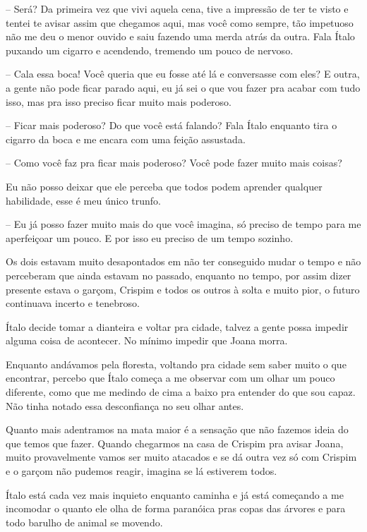 -- Será? Da primeira vez que vivi aquela cena, tive a impressão de ter te visto e tentei te avisar assim que chegamos aqui, mas você como sempre, tão impetuoso não me deu o menor ouvido e saiu fazendo uma merda atrás da outra. Fala Ítalo puxando um cigarro e acendendo, tremendo um pouco de nervoso.

-- Cala essa boca! Você queria que eu fosse até lá e conversasse com eles? E outra, a gente não pode ficar parado aqui, eu já sei o que vou fazer pra acabar com tudo isso, mas pra isso preciso ficar muito mais poderoso. 

-- Ficar mais poderoso? Do que você está falando? Fala Ítalo enquanto tira o cigarro da boca e me encara com uma feição assustada.

-- Como você faz pra ficar mais poderoso? Você pode fazer muito mais coisas?

Eu não posso deixar que ele perceba que todos podem aprender qualquer habilidade, esse é meu único trunfo.

-- Eu já posso fazer muito mais do que você imagina, só preciso de tempo para me aperfeiçoar um pouco. E por isso eu preciso de um tempo sozinho.

Os dois estavam muito desapontados em não ter conseguido mudar o tempo e não perceberam que ainda estavam no passado, enquanto no tempo, por assim dizer presente estava o garçom, Crispim e todos os outros à solta e muito pior, o futuro continuava incerto e tenebroso.

Ítalo decide tomar a dianteira e voltar pra cidade, talvez a gente possa impedir alguma coisa de acontecer. No mínimo impedir que Joana morra.

Enquanto andávamos pela floresta, voltando pra cidade sem saber muito o que encontrar, percebo que Ítalo começa a me observar com um olhar um pouco diferente, como que me medindo de cima a baixo pra entender do que sou capaz. Não tinha notado essa desconfiança no seu olhar antes. 

Quanto mais adentramos na mata maior é a sensação que não fazemos ideia do que temos que fazer. Quando chegarmos na casa de Crispim pra avisar Joana, muito provavelmente vamos ser muito atacados e se dá outra vez só com Crispim e o garçom não pudemos reagir, imagina se lá estiverem todos.

Ítalo está cada vez mais inquieto enquanto caminha e já está começando a me incomodar o quanto ele olha de forma paranóica pras copas das árvores e para todo barulho de animal se movendo.


